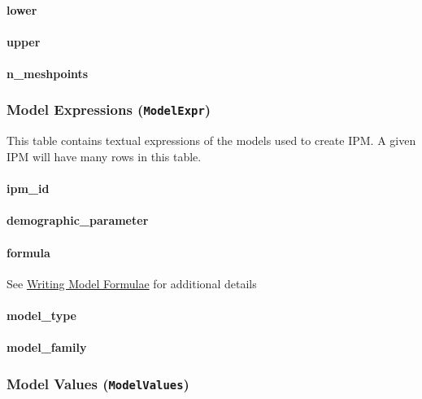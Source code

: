 \documentclass[]{article}
\let\oldparagraph\paragraph
\renewcommand{\paragraph}[1]{\oldparagraph{#1}\mbox{}}
\begin{document}
\paragraph{lower}\label{lower}

\paragraph{upper}\label{upper}

\paragraph{n\_meshpoints}\label{n_meshpoints}

\subsubsection{\texorpdfstring{Model Expressions
(\texttt{ModelExpr})}{Model Expressions (ModelExpr)}}\label{model-expressions-modelexpr}

This table contains textual expressions of the models used to create
IPM. A given IPM will have many rows in this table.

\paragraph{ipm\_id}\label{ipm_id-3}

\paragraph{demographic\_parameter}\label{demographic_parameter}

\paragraph{formula}\label{formula}

See \protect\hyperlink{model-forms}{Writing Model Formulae} for
additional details

\paragraph{model\_type}\label{model_type}

\paragraph{model\_family}\label{model_family}

\subsubsection{\texorpdfstring{Model Values
(\texttt{ModelValues})}{Model Values (ModelValues)}}\label{model-values-modelvalues}
\end{document}
